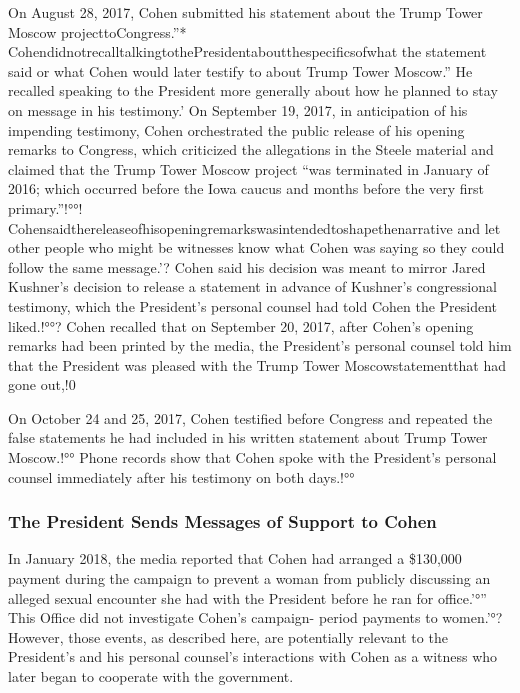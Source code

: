 On August 28, 2017, Cohen submitted his statement about the Trump Tower Moscow projecttoCongress.”* CohendidnotrecalltalkingtothePresidentaboutthespecificsofwhat the statement said or what Cohen would later testify to about Trump Tower Moscow.” He recalled speaking to the President more generally about how he planned to stay on message in his testimony.' On September 19, 2017, in anticipation of his impending testimony, Cohen orchestrated the public release of his opening remarks to Congress, which criticized the allegations in the Steele material and claimed that the Trump Tower Moscow project “was terminated in January of 2016; which occurred before the Iowa caucus and months before the very first primary.”!°°! Cohensaidthereleaseofhisopeningremarkswasintendedtoshapethenarrative and let other people who might be witnesses know what Cohen was saying so they could follow the same message.'? Cohen said his decision was meant to mirror Jared Kushner's decision to release a statement in advance of Kushner's congressional testimony, which the President's personal counsel had told Cohen the President liked.!°°? Cohen recalled that on September 20, 2017, after Cohen's opening remarks had been printed by the media, the President's personal counsel told him that the President was pleased with the Trump Tower Moscowstatementthat had gone out,!0%

On October 24 and 25, 2017, Cohen testified before Congress and repeated the false statements he had included in his written statement about Trump Tower Moscow.!°° Phone records show that Cohen spoke with the President's personal counsel immediately after his testimony on both days.!°°%

\subsubsection{The President Sends Messages of Support to Cohen}

In January 2018, the media reported that Cohen had arranged a \$130,000 payment during the campaign to prevent a woman from publicly discussing an alleged sexual encounter she had with the President before he ran for office.'°” This Office did not investigate Cohen's campaign- period payments to women.'°? However, those events, as described here, are potentially relevant to the President's and his personal counsel's interactions with Cohen as a witness who later began to cooperate with the government.

